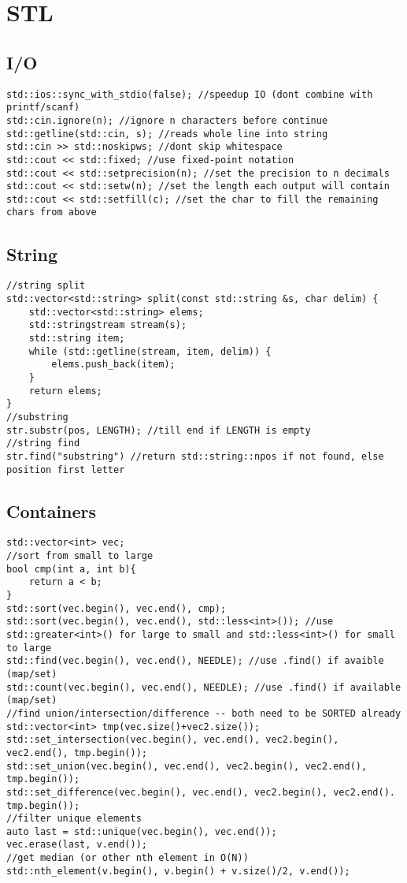 \section{STL}
\subsection{I/O}
\begin{verbatim}
std::ios::sync_with_stdio(false); //speedup IO (dont combine with printf/scanf)
std::cin.ignore(n); //ignore n characters before continue
std::getline(std::cin, s); //reads whole line into string
std::cin >> std::noskipws; //dont skip whitespace
std::cout << std::fixed; //use fixed-point notation
std::cout << std::setprecision(n); //set the precision to n decimals
std::cout << std::setw(n); //set the length each output will contain
std::cout << std::setfill(c); //set the char to fill the remaining chars from above
\end{verbatim}
\subsection{String}
\begin{verbatim}
//string split
std::vector<std::string> split(const std::string &s, char delim) {
    std::vector<std::string> elems;
    std::stringstream stream(s);
    std::string item;
    while (std::getline(stream, item, delim)) {
        elems.push_back(item);
    }
    return elems;
}
//substring
str.substr(pos, LENGTH); //till end if LENGTH is empty
//string find
str.find("substring") //return std::string::npos if not found, else position first letter
\end{verbatim}

\subsection{Containers}
\begin{verbatim}
std::vector<int> vec;
//sort from small to large
bool cmp(int a, int b){
    return a < b;
}
std::sort(vec.begin(), vec.end(), cmp); 
std::sort(vec.begin(), vec.end(), std::less<int>()); //use std::greater<int>() for large to small and std::less<int>() for small to large
std::find(vec.begin(), vec.end(), NEEDLE); //use .find() if avaible (map/set)
std::count(vec.begin(), vec.end(), NEEDLE); //use .find() if available (map/set)
//find union/intersection/difference -- both need to be SORTED already
std::vector<int> tmp(vec.size()+vec2.size());
std::set_intersection(vec.begin(), vec.end(), vec2.begin(), vec2.end(), tmp.begin());
std::set_union(vec.begin(), vec.end(), vec2.begin(), vec2.end(), tmp.begin());
std::set_difference(vec.begin(), vec.end(), vec2.begin(), vec2.end(). tmp.begin());
//filter unique elements
auto last = std::unique(vec.begin(), vec.end());
vec.erase(last, v.end());
//get median (or other nth element in O(N))
std::nth_element(v.begin(), v.begin() + v.size()/2, v.end());
\end{verbatim}

